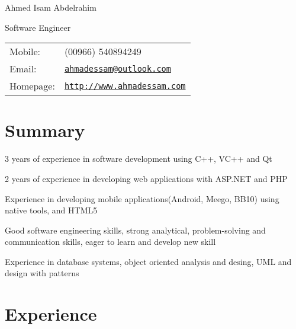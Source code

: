 \documentclass[letterpaper]{article}
\def\name{Ahmed Isam Abdelrahim}
\renewenvironment{itemize}{
  \begin{list}{}{
    \setlength{\leftmargin}{1.5em}
  }
}{
  \end{list}
}
\begin{document}
{\huge \name}


\vspace{0.10in}

\begin{minipage}{0.45\linewidth}
  Software Engineer \\
 
\end{minipage}
\begin{minipage}{0.45\linewidth}
  \begin{tabular}{ll}
    Mobile: & (00966) 540894249 \\
    Email: & \href{mailto:ahmadessam@outlook.com}{\tt ahmadessam@outlook.com} \\
    Homepage: & \href{http://www.ahmadessam.com}{\tt http://www.ahmadessam.com} \\
  \end{tabular}
\end{minipage}

\section*{Summary}
\begin{itemize}
\item 3 years of experience in software development using C++, VC++ and Qt
\item 2 years of experience in developing web applications with ASP.NET and PHP
\item Experience in developing mobile applications(Android, Meego, BB10) using native tools, and HTML5
\item Good software engineering skills, strong analytical, problem-solving and communication skills, eager to learn and develop new skill
\item Experience in database systems, object oriented analysis and desing, UML and design with patterns
\end{itemize}


\section*{Experience}
\end{document}
